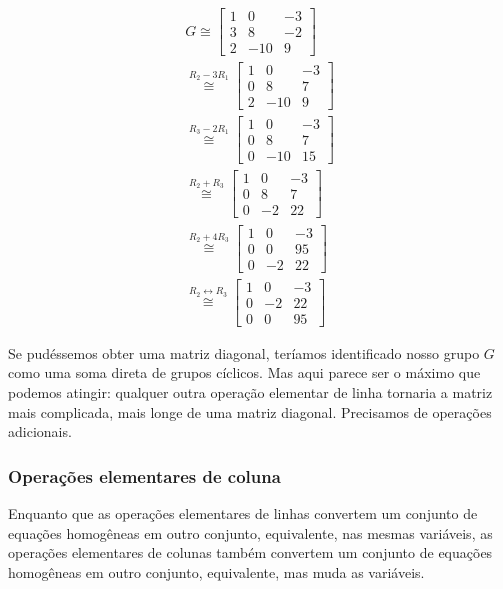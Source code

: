     	\begin{align*} 
        	G \cong \begin{bmatrix}
        	1 & 0 & -3 \\
        	3 & 8 & -2 \\
        	2 & -10 & 9
        	\end{bmatrix} \\ \stackrel{R_2 - 3R_1}{\cong} \begin{bmatrix}
        	1 & 0 & -3 \\
        	0 & 8 & 7 \\
        	2 & -10 & 9
        	\end{bmatrix} \\ \stackrel{R_3 - 2R_1}{\cong} \begin{bmatrix}
        	1 & 0 & -3 \\
        	0 & 8 & 7 \\
        	0 & -10 & 15
        	\end{bmatrix} \\ \stackrel{R_2 + R_3}{\cong} \begin{bmatrix}
        	1 & 0 & -3 \\
        	0 & 8 & 7 \\
        	0 & -2 & 22
        	\end{bmatrix} \\ \stackrel{R_2 + 4R_3}{\cong} \begin{bmatrix}
        	1 & 0 & -3 \\
        	0 & 0 & 95 \\
        	0 & -2 & 22
        	\end{bmatrix} \\ \stackrel{R_2\leftrightarrow R_3}{\cong} \begin{bmatrix}
        	1 & 0 & -3 \\
        	0 & -2 & 22 \\
        	0 & 0 & 95 
        	\end{bmatrix}
    	\end{align*}
    	\par\vspace{0.3cm} Se pudéssemos obter uma matriz diagonal, teríamos identificado nosso grupo $G$ 
    	como uma soma direta de grupos cíclicos. Mas aqui parece ser o máximo que podemos atingir: qualquer 
    	outra operação elementar de linha tornaria a matriz mais complicada, mais longe de uma matriz diagonal.
    	Precisamos de operações adicionais.
    	
    	\subsubsection{Operações elementares de coluna}
    	Enquanto que as operações elementares de linhas convertem um conjunto de equações homogêneas em 
    	outro conjunto, equivalente, nas mesmas variáveis, as operações elementares de colunas também 
    	convertem um conjunto de  equações homogêneas em outro conjunto, equivalente, mas muda as variáveis.
    	
